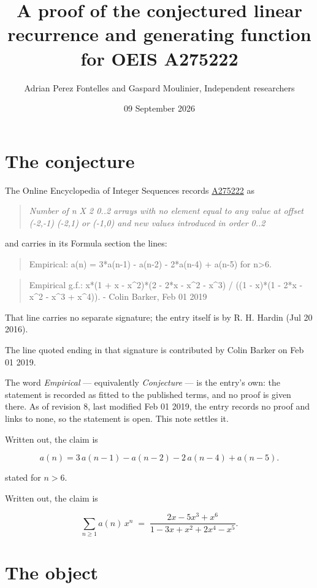 \documentclass[11pt]{article}
\title{A proof of the conjectured linear recurrence and generating function for OEIS A275222}
\author{Adrian Perez Fontelles and Gaspard Moulinier, Independent researchers}
\date{09 September 2026}
\theoremstyle{definition}
\begin{document}
\maketitle
\section{The conjecture}

The Online Encyclopedia of Integer Sequences records \href{https://oeis.org/A275222}{A275222} as

\begin{quote}\itshape Number of n X 2 0..2 arrays with no element equal to any value at offset (-2,-1) (-2,1) or (-1,0) and new values introduced in order 0..2\end{quote}

and carries in its Formula section the lines:

\begin{quote}\ttfamily Empirical: a(n) = 3*a(n-1) - a(n-2) - 2*a(n-4) + a(n-5) for n>6.\end{quote}

\begin{quote}\ttfamily Empirical g.f.: x*(1 + x - x\textasciicircum{}2)*(2 - 2*x - x\textasciicircum{}2 - x\textasciicircum{}3) / ((1 - x)*(1 - 2*x - x\textasciicircum{}2 - x\textasciicircum{}3 + x\textasciicircum{}4)). - Colin Barker, Feb 01 2019\end{quote}

That line carries no separate signature; the entry itself is by R. H. Hardin (Jul 20 2016).

The line quoted ending in that signature is contributed by Colin Barker on Feb 01 2019.

The word {\itshape Empirical} --- equivalently {\itshape Conjecture} --- is the entry's own: the statement is recorded as fitted to the published terms, and no proof is given there. As of revision 8, last modified Feb 01 2019, the entry records no proof and links to none, so the statement is open. This note settles it.

Written out, the claim is

\[a(n) = 3\,a(n-1) - a(n-2) - 2\,a(n-4) + a(n-5).\]

stated for $n > 6$.

Written out, the claim is

\[\sum_{n \ge 1} a(n)\,x^n \;=\; \frac{2x - 5x^{3} + x^{6}}{1 - 3x + x^{2} + 2x^{4} - x^{5}}.\]

\section{The object}
\end{document}
